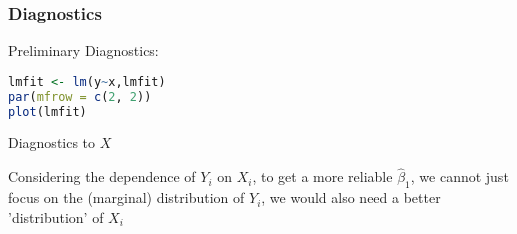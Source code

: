 \subsubsection{Diagnostics}\label{SubSecDiagnostics}


    Preliminary Diagnostics:
\begin{rcode}
\begin{lstlisting}[language=R]
lmfit <- lm(y~x,lmfit)
par(mfrow = c(2, 2))
plot(lmfit)
\end{lstlisting}

\end{rcode}
    

\begin{point}
    Diagnostics to $ X $
\end{point}

    Considering the dependence of $ Y_i $ on $ X_i $, to get a more reliable $ \hat{\beta }_1 $, we cannot just focus on the (marginal) distribution of $ Y_i $, we would also need a better 'distribution' of $ X_i $
